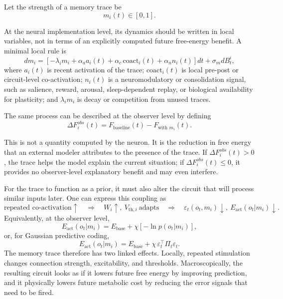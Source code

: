 \documentclass[11pt, a4paper]{article}
\begin{document}
Let the strength of a memory trace be
\begin{equation}
m_i(t)\in[0,1].
\end{equation}

At the neural implementation level, its dynamics should be written in local variables, not in terms of an explicitly computed future free-energy benefit. A minimal local rule is
\begin{equation}
dm_i
=
\left[
-\lambda_i m_i
+
\alpha_a a_i(t)
+
\alpha_c\,\mathrm{coact}_i(t)
+
\alpha_n n_i(t)
\right]dt
+
\sigma_m dB_t^i,
\end{equation}
where $a_i(t)$ is recent activation of the trace; $\mathrm{coact}_i(t)$ is local pre-post or circuit-level co-activation; $n_i(t)$ is a neuromodulatory or consolidation signal, such as salience, reward, arousal, sleep-dependent replay, or biological availability for plasticity; and $\lambda_i m_i$ is decay or competition from unused traces.

The same process can be described at the observer level by defining
\begin{equation}
\Delta F_i^{obs}(t)
=
F_{\text{baseline}}(t)
-
F_{\text{with }m_i}(t).
\end{equation}

This is not a quantity computed by the neuron. It is the reduction in free energy that an external modeler attributes to the presence of the trace. If $\Delta F_i^{obs}(t)>0$, the trace helps the model explain the current situation; if $\Delta F_i^{obs}(t)\le 0$, it provides no observer-level explanatory benefit and may even interfere.

For the trace to function as a prior, it must also alter the circuit that will process similar inputs later. One can express this coupling as
\begin{equation}
\text{repeated co-activation}\uparrow
\quad\Longrightarrow\quad
W_i\uparrow,\ V_{\mathrm{th},i}\ \text{adapts}
\quad\Longrightarrow\quad
\varepsilon_t(o_t,m_i)\downarrow,\ E_{\mathrm{act}}(o_t|m_i)\downarrow.
\end{equation}
Equivalently, at the observer level,
\begin{equation}
E_{\mathrm{act}}(o_t|m_i)
=
E_{\mathrm{base}}
+
\chi[-\ln p(o_t|m_i)],
\end{equation}
or, for Gaussian predictive coding,
\begin{equation}
E_{\mathrm{act}}(o_t|m_i)
=
E_{\mathrm{base}}
+
\chi\,\varepsilon_t^\top\Pi_t\varepsilon_t.
\end{equation}
The memory trace therefore has two linked effects. Locally, repeated stimulation changes connection strength, excitability, and thresholds. Macroscopically, the resulting circuit looks as if it lowers future free energy by improving prediction, and it physically lowers future metabolic cost by reducing the error signals that need to be fired.
\end{document}
